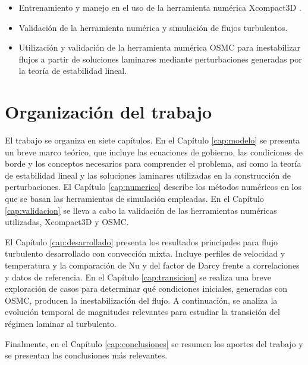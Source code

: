 \begin{itemize}

	\item Entrenamiento y manejo en el uso de la herramienta numérica Xcompact3D \linebreak \cite{bartholomew2020xcompact3d}.
	
	\item Validación de la herramienta numérica y simulación de flujos turbulentos.

	\item Utilización y validación de la herramienta numérica OSMC \cite{szuban2023} para inestabilizar flujos a partir de soluciones laminares mediante perturbaciones \linebreak generadas por la teoría de estabilidad lineal.

\end{itemize}

\section{Organización del trabajo}

El trabajo se organiza en siete capítulos. En el Capítulo \ref{cap:modelo} se presenta un breve marco teórico, que incluye las ecuaciones de gobierno, las condiciones de borde y los conceptos necesarios para comprender el problema, así como la teoría de estabilidad lineal y las soluciones laminares utilizadas en la construcción de perturbaciones. El Capítulo \ref{cap:numerico} describe los métodos numéricos en los que se basan las herramientas de simulación empleadas. En el Capítulo \ref{cap:validacion} se lleva a cabo la validación de las herramientas numéricas utilizadas, Xcompact3D y OSMC.

El Capítulo \ref{cap:desarrollado} presenta los resultados principales para flujo turbulento desarrollado con convección mixta. Incluye perfiles de velocidad y temperatura y la comparación de Nu y del factor de Darcy frente a correlaciones y datos de referencia. En el Capítulo \ref{cap:transicion} se realiza una breve exploración de casos para determinar qué condiciones iniciales, generadas con OSMC, producen la inestabilización del flujo. A continuación, se analiza la evolución temporal de magnitudes relevantes para estudiar la transición del régimen laminar al turbulento.

Finalmente, en el Capítulo \ref{cap:conclusiones} se resumen los aportes del trabajo y se presentan las conclusiones más relevantes.